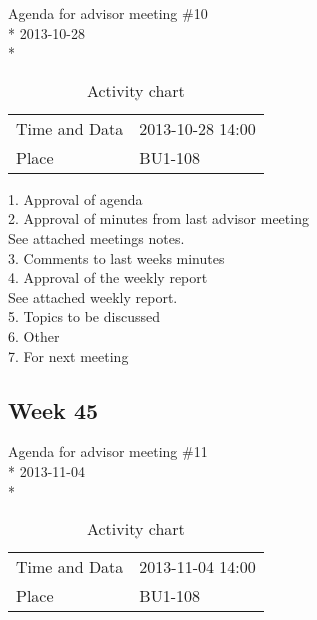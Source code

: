 \begin{center}
Agenda for advisor meeting \#10\\*
2013-10-28\\*
\end{center}

\begin{table}[H]
\begin{center}
\begin{tabular}{ l | l }
Time and Data & 2013-10-28 14:00 \\
Place & BU1-108 \\
\end{tabular}
\end{center}
\caption{Activity chart}
\label{table:activityChartAdvisorAgendaWeek44}
\end{table}


1. Approval of agenda \\
2. Approval of minutes from last advisor meeting \\
See attached meetings notes. \\
3. Comments to last weeks minutes \\
4. Approval of the weekly report \\
See attached weekly report. \\
5. Topics to be discussed \\
6. Other \\
7. For next meeting \\

\newpage
\subsection{Week 45}

\begin{center}
Agenda for advisor meeting \#11\\*
2013-11-04\\*
\end{center}

\begin{table}[H]
\begin{center}
\begin{tabular}{ l | l }
Time and Data & 2013-11-04 14:00 \\
Place & BU1-108 \\
\end{tabular}
\end{center}
\caption{Activity chart}
\label{table:activityChartAdvisorAgendaWeek45}
\end{table}


